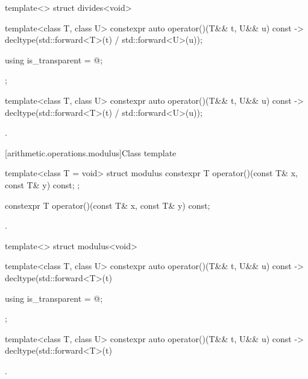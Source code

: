%
\begin{itemdecl}
template<> struct divides<void> {
  template<class T, class U> constexpr auto operator()(T&& t, U&& u) const
    -> decltype(std::forward<T>(t) / std::forward<U>(u));

  using is_transparent = @\unspec@;
};
\end{itemdecl}

%
\begin{itemdecl}
template<class T, class U> constexpr auto operator()(T&& t, U&& u) const
    -> decltype(std::forward<T>(t) / std::forward<U>(u));
\end{itemdecl}

\begin{itemdescr}
\pnum
\returns
{}.
\end{itemdescr}

[arithmetic.operations.modulus]{Class template }

%
\begin{itemdecl}
template<class T = void> struct modulus {
  constexpr T operator()(const T& x, const T& y) const;
};
\end{itemdecl}

%
\begin{itemdecl}
constexpr T operator()(const T& x, const T& y) const;
\end{itemdecl}

\begin{itemdescr}
\pnum
\returns
{}.
\end{itemdescr}

%
\begin{itemdecl}
template<> struct modulus<void> {
  template<class T, class U> constexpr auto operator()(T&& t, U&& u) const
    -> decltype(std::forward<T>(t) %

  using is_transparent = @\unspec@;
};
\end{itemdecl}

%
\begin{itemdecl}
template<class T, class U> constexpr auto operator()(T&& t, U&& u) const
    -> decltype(std::forward<T>(t) %
\end{itemdecl}

\begin{itemdescr}
\pnum
\returns
{}.
\end{itemdescr}

